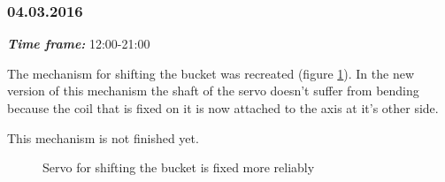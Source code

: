 \subsubsection{04.03.2016}
\textit{\textbf{Time frame:}} 12:00-21:00 

The mechanism for shifting the bucket was recreated (figure \ref{Shiftbuc2.8}). In the new version of this mechanism the shaft of the servo doesn't suffer from bending because the coil that is fixed on it is now attached to the axis at it's other side. 

This mechanism is not finished yet.

\begin{figure}[H]
	\begin{minipage}[h]{1\linewidth}
		\caption{Servo for shifting the bucket is fixed more reliably}
		\label{Shiftbuc2.8}
	\end{minipage}
\end{figure}
